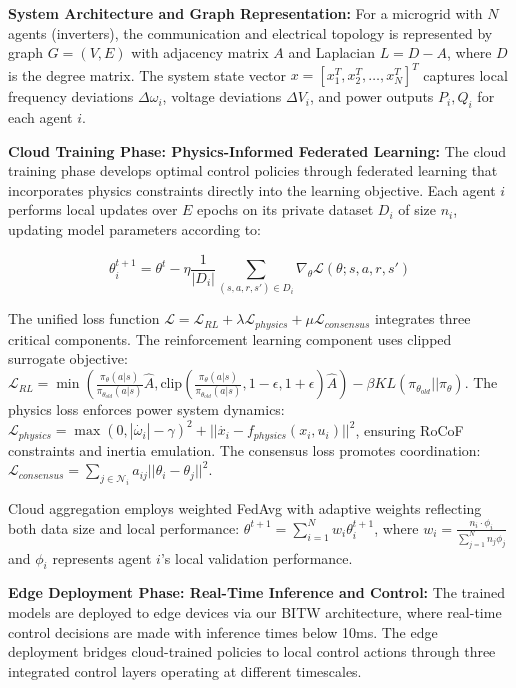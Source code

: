 \documentclass[12pt]{article}
\begin{document}
\textbf{System Architecture and Graph Representation:} For a microgrid with $N$ agents (inverters), the communication and electrical topology is represented by graph $G = (V, E)$ with adjacency matrix $A$ and Laplacian $L = D - A$, where $D$ is the degree matrix. The system state vector $x = [x_1^T, x_2^T, \ldots, x_N^T]^T$ captures local frequency deviations $\Delta\omega_i$, voltage deviations $\Delta V_i$, and power outputs $P_i, Q_i$ for each agent $i$.

\textbf{Cloud Training Phase: Physics-Informed Federated Learning:} The cloud training phase develops optimal control policies through federated learning that incorporates physics constraints directly into the learning objective. Each agent $i$ performs local updates over $E$ epochs on its private dataset $D_i$ of size $n_i$, updating model parameters according to:

$$\theta_i^{t+1} = \theta^t - \eta \frac{1}{|D_i|} \sum_{(s,a,r,s') \in D_i} \nabla_{\theta} \mathcal{L}(\theta; s, a, r, s')$$

The unified loss function $\mathcal{L} = \mathcal{L}_{RL} + \lambda \mathcal{L}_{physics} + \mu \mathcal{L}_{consensus}$ integrates three critical components. The reinforcement learning component uses clipped surrogate objective: $\mathcal{L}_{RL} = \min\left(\frac{\pi_{\theta}(a|s)}{\pi_{\theta_{old}}(a|s)} \hat{A}, \text{clip}\left(\frac{\pi_{\theta}(a|s)}{\pi_{\theta_{old}}(a|s)}, 1-\epsilon, 1+\epsilon\right) \hat{A}\right) - \beta KL(\pi_{\theta_{old}} || \pi_{\theta})$. The physics loss enforces power system dynamics: $\mathcal{L}_{physics} = \max(0, |\dot{\omega_i}| - \gamma)^2 + ||\dot{x_i} - f_{physics}(x_i, u_i)||^2$, ensuring RoCoF constraints and inertia emulation. The consensus loss promotes coordination: $\mathcal{L}_{consensus} = \sum_{j \in \mathcal{N}_i} a_{ij} ||\theta_i - \theta_j||^2$.

Cloud aggregation employs weighted FedAvg with adaptive weights reflecting both data size and local performance: $\theta^{t+1} = \sum_{i=1}^N w_i \theta_i^{t+1}$, where $w_i = \frac{n_i \cdot \phi_i}{\sum_{j=1}^N n_j \phi_j}$ and $\phi_i$ represents agent $i$'s local validation performance.

\textbf{Edge Deployment Phase: Real-Time Inference and Control:} The trained models are deployed to edge devices via our BITW architecture, where real-time control decisions are made with inference times below 10ms. The edge deployment bridges cloud-trained policies to local control actions through three integrated control layers operating at different timescales.
\end{document}
